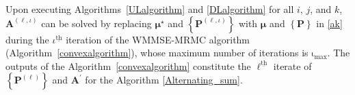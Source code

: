 \documentclass[10pt,journal]{IEEEtran}
\newcommand{\paren}[1]{\left({#1}\right)}
\newcommand{\bracket}[1]{{\left [{#1}\right ]}}
\newcommand{\braces}[1]{{\left\{ {#1}\right\}}}
\newcommand{\ith}[1]    {{#1}^{\underline{\text{th}}}}
\newcommand{\PiB}{\mathbf{P}_{\textrm{u},i}\bracket{k}}
\theoremstyle{definition}
\begin{document}
\normalsize

Upon executing Algorithms~\ref{ULalgorithm} and \ref{DLalgorithm} for all $i$, $j$, and $k$, $\mathbf{A}^{\paren{\ell,\iota}}$ can be solved by replacing  $\boldsymbol{\mu}^\star$ and $\braces{\mathbf{P}^{\paren{\ell,\iota}}}$ with $\boldsymbol{\mu}$ and $\braces{\mathbf{P}}$ in \eqref{ak} during the $\ith{\iota}$ iteration of the WMMSE-MRMC algorithm (Algorithm~\ref{convexalgorithm}), whose maximum number of iterations is $\mathrm{\iota}_{\textrm{max}}$. The outputs of the Algorithm~\ref{convexalgorithm} constitute the $\ith{\ell}$ iterate of $\braces{\mathbf{P}^{\paren{\ell}}}$ and $\mathbf{A}^\prime$ for the Algorithm \ref{Alternating_sum}.  %
\end{document}
